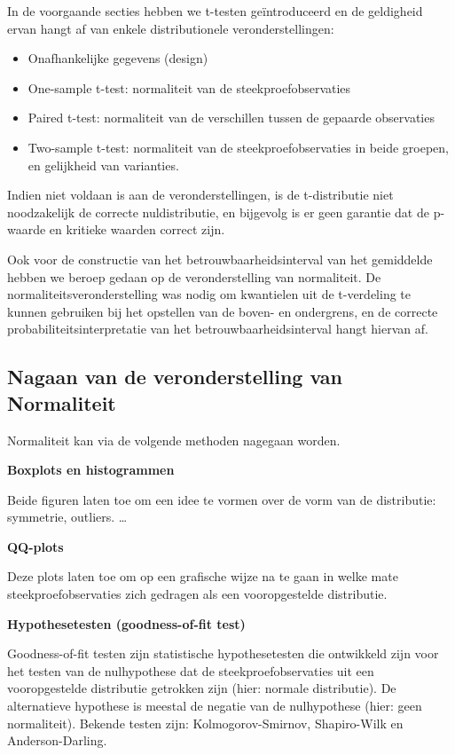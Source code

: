 \documentclass[
  12pt,dutch,coursenotes]{book}
\providecommand{\tightlist}{%
  \setlength{\itemsep}{0pt}\setlength{\parskip}{0pt}}
\theoremstyle{definition}
\theoremstyle{definition}
\theoremstyle{definition}
\theoremstyle{remark}
\begin{document}
In de voorgaande secties hebben we t-testen geïntroduceerd en de geldigheid ervan hangt af van enkele distributionele veronderstellingen:

\begin{itemize}
\tightlist
\item
  Onafhankelijke gegevens (design)
\item
  One-sample t-test: normaliteit van de steekproefobservaties
\item
  Paired t-test: normaliteit van de verschillen tussen de gepaarde observaties
\item
  Two-sample t-test: normaliteit van de steekproefobservaties in beide groepen, en gelijkheid van varianties.
\end{itemize}

Indien niet voldaan is aan de veronderstellingen, is de t-distributie niet noodzakelijk de correcte nuldistributie, en bijgevolg is er geen garantie dat de p-waarde en kritieke waarden correct zijn.

Ook voor de constructie van het betrouwbaarheidsinterval van het gemiddelde hebben we beroep gedaan op de veronderstelling van normaliteit. De normaliteitsveronderstelling was nodig om kwantielen uit de t-verdeling te kunnen gebruiken bij het opstellen van de boven- en ondergrens, en de correcte probabiliteitsinterpretatie van het betrouwbaarheidsinterval hangt hiervan af.

\hypertarget{nagaan-van-de-veronderstelling-van-normaliteit}{%
\subsection{Nagaan van de veronderstelling van Normaliteit}\label{nagaan-van-de-veronderstelling-van-normaliteit}}

Normaliteit kan via de volgende methoden nagegaan worden.

\textbf{Boxplots en histogrammen}

Beide figuren laten toe om een idee te vormen over de vorm van de distributie: symmetrie, outliers. \ldots

\textbf{QQ-plots}

Deze plots laten toe om op een grafische wijze na te gaan in welke mate steekproefobservaties zich gedragen als een vooropgestelde distributie.

\textbf{Hypothesetesten (goodness-of-fit test)}

Goodness-of-fit testen zijn statistische hypothesetesten die ontwikkeld zijn voor het testen van de nulhypothese dat de steekproefobservaties uit een vooropgestelde distributie getrokken zijn (hier: normale distributie). De alternatieve hypothese is meestal de negatie van de nulhypothese (hier: geen normaliteit). Bekende testen zijn: Kolmogorov-Smirnov, Shapiro-Wilk en Anderson-Darling.
\end{document}
